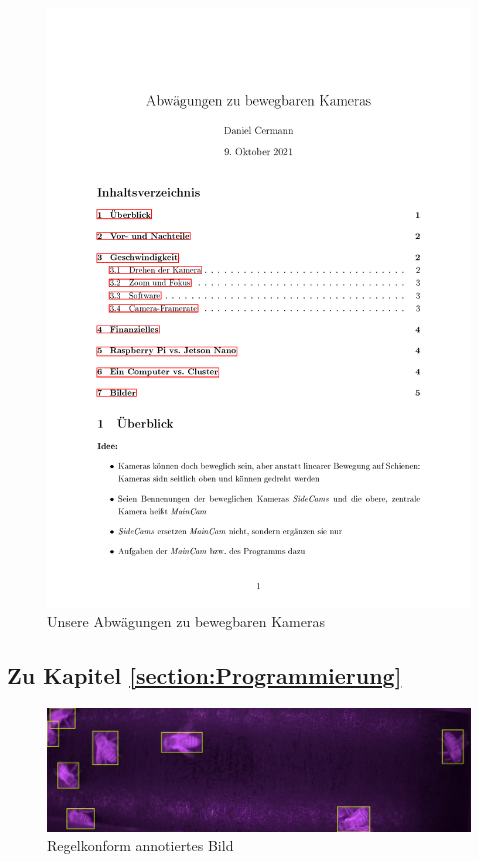 \documentclass[11pt,a4paper]{article}
\begin{document}
\begin{figure}[H]
    \includegraphics[page=2, scale=.3]{images/TPZ_Cameras_Idea.pdf}    
    \caption{Unsere Abwägungen zu bewegbaren Kameras}
    \label{fig:moving_cameras_considerations}
\end{figure}

\subsection{Zu Kapitel \autoref{section:Programmierung}}
\begin{figure}[!htb] \label{annotated1}
    \centering
	    \includegraphics[width = .8\textwidth]{images/annotated1.png}
        \caption{Regelkonform annotiertes Bild}
\end{figure}
\end{document}
